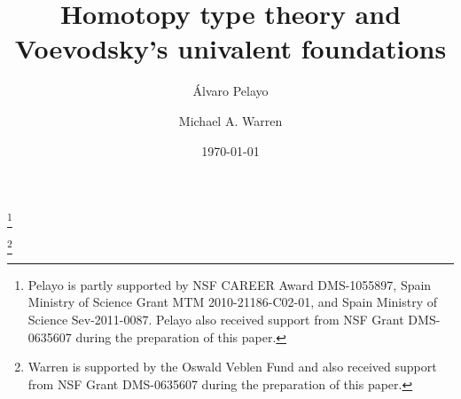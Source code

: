 \documentclass[11pt]{amsart}
\theoremstyle{definition}
\theoremstyle{remark}
\numberwithin{equation}{section}
\begin{document}
\setcounter{myi}{0}

\title[Homotopy type theory]{Homotopy type theory and
  Voevodsky's univalent foundations}


\author[\'{A}. Pelayo]{\'{A}lvaro Pelayo}
\address{Washington University\\  
  Mathematics Department \\
  One Brookings Drive, Campus Box 1146\\
  St Louis, MO 63130, USA, AND School of Mathematics,
  Institute for Advanced Study\\
  Einstein Drive, Princeton\\
  NJ 08540 USA}
\thanks{Pelayo is partly supported by NSF CAREER Award DMS-1055897, Spain 
Ministry of Science Grant MTM 2010-21186-C02-01, and 
Spain Ministry of Science Sev-2011-0087.  Pelayo also received support
from NSF Grant DMS-0635607 during the preparation of this paper.}
\author[M. A. Warren]{Michael A. Warren}
\address{School of Mathematics,
  Institute for Advanced Study\\
  Einstein Drive, Princeton\\
  NJ 08540 USA.}
\curraddr{}
\thanks{Warren is supported by the Oswald Veblen Fund and also
  received support from NSF Grant DMS-0635607 during the preparation
  of this paper.}


\date{\today}

\dedicatory{}
\end{document}
